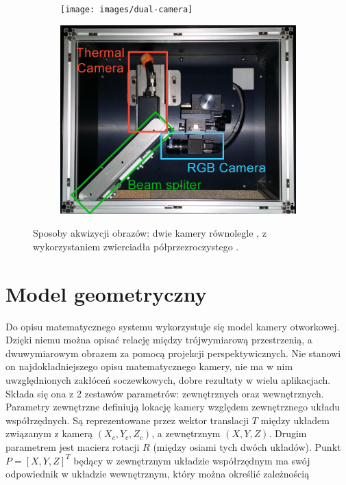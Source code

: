 \begin{figure}[h]
\centering
\begin{subfigure}{0.45\textwidth}
\centering
\texttt{[image: images/dual-camera]}
\subcaption{\label{dual_camera}}
\end{subfigure}
\begin{subfigure}{0.45\textwidth}
\centering
\includegraphics[width=1\textwidth]{images/multispectral}
\subcaption{\label{multispectral}}
\end{subfigure}
\caption{\label{fig:cameras_systems}Sposoby akwizycji obrazów: \protect{} dwie kamery równolegle \cite{lee2015robust}, \protect{} z wykorzystaniem zwierciadła półprzezroczystego \cite{hwang2015multispectral}.}
\end{figure}


\section{Model geometryczny}

Do opisu matematycznego systemu wykorzystuje się model kamery otworkowej. 
Dzięki niemu można opisać relację między trójwymiarową przestrzenią, a dwuwymiarowym obrazem za pomocą projekcji perspektywicznych. %
Nie stanowi on najdokładniejszego opisu matematycznego kamery, nie ma w nim uwzględnionych zakłóceń soczewkowych, dobre rezultaty w wielu aplikacjach.  %
Składa się ona z 2 zestawów parametrów: zewnętrznych oraz wewnętrznych.
Parametry zewnętrzne definiują lokację kamery względem zewnętrznego układu współrzędnych. 
Są reprezentowane przez wektor translacji \(T\) między układem związanym z kamerą \( \left ( X_{c},Y_{c},Z_{c}\right ) \),
a zewnętrznym \(\left ( X,Y,Z\right )\). 
Drugim parametrem jest macierz rotacji \( R \) (między osiami tych dwóch układów).
Punkt \(P = \left [ X,Y,Z \right ]^T \) będący w zewnętrznym układzie współrzędnym ma swój odpowiednik w układzie wewnętrznym, który można określić zależnością 

